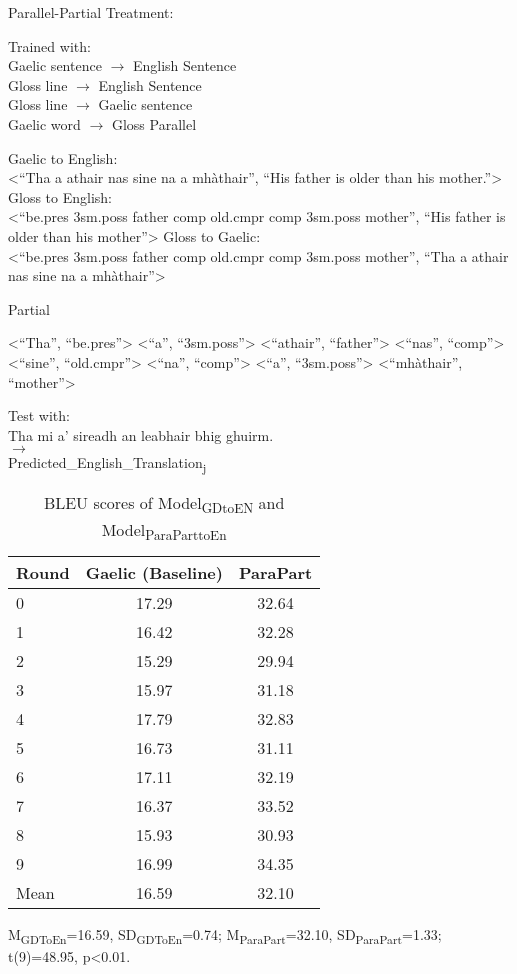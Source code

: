 \documentclass[a4paper]{article}
\begin{document}
\begin{exe}  
\ex Parallel-Partial Treatment: 
\begin{xlist}
	\ex Trained with:\\
	 Gaelic sentence $\rightarrow$ English Sentence\\ 
	 Gloss line $\rightarrow$ English Sentence \\
	 Gloss line $\rightarrow$ Gaelic sentence\\
	 Gaelic word $\rightarrow$ Gloss 
	 \ex Parallel
	\begin{xlist}
		\ex Gaelic to English: \\<``Tha a athair nas sine na a mh\`athair'', ``His father is older than his mother.''>
		\ex Gloss to English: \\<``be.pres 3sm.poss father comp old.cmpr comp 3sm.poss mother'', ``His father is older than his mother''>
		\ex Gloss to Gaelic: \\<``be.pres 3sm.poss father comp old.cmpr comp 3sm.poss mother'', ``Tha a athair nas sine na a mh\`athair''>
	\end{xlist}
	\ex Partial
	\begin{xlist}
		\ex <``Tha'', ``be.pres''>
		\ex <``a'', ``3sm.poss''>
		\ex <``athair'', ``father''>
		\ex <``nas'', ``comp''>
		\ex <``sine'', ``old.cmpr''>
		\ex <``na'', ``comp''>
		\ex <``a'', ``3sm.poss''>
		\ex <``mh\`athair'', ``mother''>
	\end{xlist}
	\ex Test with:\\
		Tha mi a' sireadh an leabhair bhig ghuirm.\\
		$\rightarrow$ \\
		Predicted\_English\_Translation\textsubscript{j}
\end{xlist}
\end{exe}

\begin{table}[ht]
\centering
\begin{tabular}{lcc}
  \hline
Round & Gaelic (Baseline) & ParaPart \\ 
  \hline
0 & 17.29 & 32.64 \\ 
  1 & 16.42 & 32.28 \\ 
  2 & 15.29 & 29.94 \\ 
  3 & 15.97 & 31.18 \\ 
  4 & 17.79 & 32.83 \\ 
  5 & 16.73 & 31.11 \\ 
  6 & 17.11 & 32.19 \\ 
  7 & 16.37 & 33.52 \\ 
  8 & 15.93 & 30.93 \\ 
  9 & 16.99 & 34.35 \\ 
   \hline
Mean & 16.59 & 32.10 \\ 
   \hline
\end{tabular}
\caption{BLEU scores of Model\textsubscript{GDtoEN} and Model\textsubscript{ParaParttoEn}} 
\label{Table:ParaPart}
\end{table}
M\textsubscript{GDToEn}=16.59, SD\textsubscript{GDToEn}=0.74; M\textsubscript{ParaPart}=32.10, SD\textsubscript{ParaPart}=1.33; t(9)=48.95, p<0.01.
\end{document}
